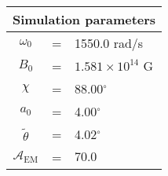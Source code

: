 \begin{tabular}{ccl}
\multicolumn{3}{c}{Simulation parameters} \\
\hline
$\omega_0$  &=& 1550.0 rad/s\\
$B_0$  &=& ${1.581}\times 10^{14}$ G \\
$\chi$  &=& 88.00$^{\circ}$ \\
$a_0$ &=& 4.00$^{\circ}$ \\
$\tilde{\theta}$ &= & 4.02$^{\circ}$ \\
$\mathcal{A}_{\mathrm{EM}}$ &= & $70.0$
\end{tabular}